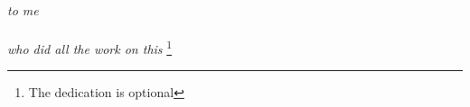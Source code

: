
\thispagestyle{plain}
\mbox{}
\vspace{2in}
\begin{center}
{\em to me \\ \ \\
who did all the work on this}
\footnote{The dedication is optional}
\end{center}
